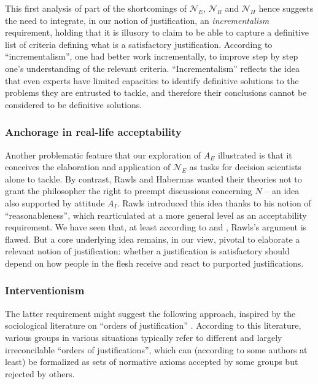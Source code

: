 \documentclass[preprint, french, english, 11pt, authoryear]{elsarticle}%
\begin{document}
This first analysis of part of the shortcomings of $\mathscr{N}_E$, $\mathscr{N}_{R}$ and $\mathscr{N}_{H}$ hence suggests the need to integrate, in our notion of justification, an \emph{incrementalism} requirement, holding that it is illusory to claim to be able to capture a definitive list of criteria defining what is a satisfactory justification. According to “incrementalism”, one had better work incrementally, to improve step by step one's understanding of the relevant criteria. “Incrementalism” reflects the idea that even experts have limited capacities to identify definitive solutions to the problems they are entrusted to tackle, and therefore their conclusions cannot be considered to be definitive solutions.

\subsubsection{Anchorage in real-life acceptability}
Another problematic feature that our exploration of $A_E$ illustrated is that it conceives the elaboration and application of $\mathscr{N}_E$ as tasks for decision scientists alone to tackle. By contrast, Rawls and Habermas wanted their theories not to grant the philosopher the right to preempt discussions concerning $N$ -- an idea also supported by attitude $A_I$. Rawls introduced this idea thanks to his notion of ``reasonableness'', which \citeauthor{estlund_democratic_2009} rearticulated at a more general level as an acceptability requirement. We have seen that, at least according to \citeauthor{habermas_reconciliation_1995} and \citeauthor{estlund_democratic_2009}, Rawls's argument is flawed. But a core underlying idea remains, in our view, pivotal to elaborate a relevant notion of justification: whether a justification is satisfactory should depend on
how people in the flesh receive and react to purported justifications.

\subsubsection{Interventionism}
The latter requirement might suggest the following approach, inspired by the sociological literature on “orders of justification” \citep{boltanski_justification_2006}. 
According to this literature, various groups in various situations typically refer to different and largely irreconcilable “orders of justifications”, which can (according to some authors at least) be formalized as sets of normative axioms accepted by some groups but rejected by others.
\end{document}
